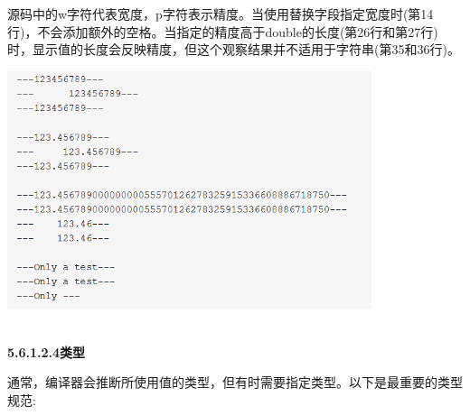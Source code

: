 源码中的w字符代表宽度，p字符表示精度。当使用替换字段指定宽度时(第14行)，不会添加额外的空格。当指定的精度高于double的长度(第26行和第27行)时，显示值的长度会反映精度，但这个观察结果并不适用于字符串(第35和36行)。

\begin{center}
\includegraphics[width=0.8\textwidth]{content/3/chapter5/images/30.png}\\
\end{center}

\hspace*{\fill} \\ %
\noindent
\textbf{5.6.1.2.4\hspace{0.2cm}类型}

通常，编译器会推断所使用值的类型，但有时需要指定类型。以下是最重要的类型规范:


